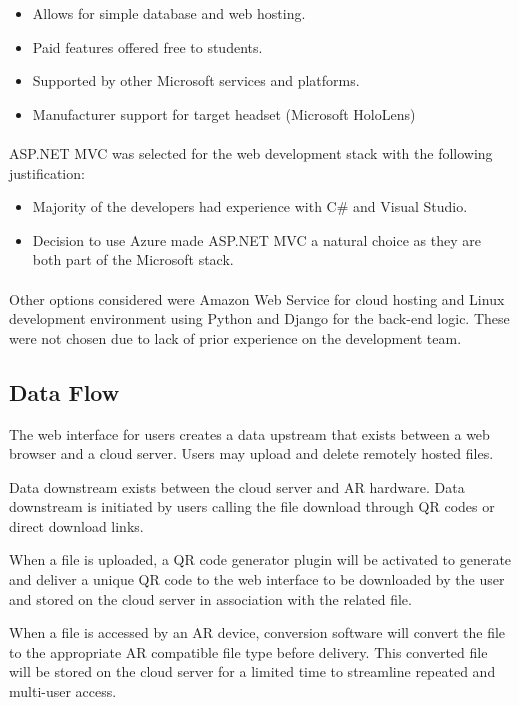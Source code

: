  \begin{itemize}
    \item Allows for simple database and web hosting.
    \item Paid features offered free to students.
    \item Supported by other Microsoft services and platforms. 
    \item Manufacturer support for target headset (Microsoft HoloLens)
 \end{itemize}
 
 \paragraph{}
 ASP.NET MVC was selected for the web development stack with the following justification:

\begin{itemize}
    \item Majority of the developers had experience with C\# and Visual Studio.
    \item Decision to use Azure made ASP.NET MVC a natural choice as they are both part of the Microsoft stack.
\end{itemize}

\paragraph{}
Other options considered were Amazon Web Service for cloud hosting and Linux development environment using Python and Django for the back-end logic. These were not chosen due to lack of prior experience on the development team. 

 \subsection{Data Flow}
The web interface for users creates a data upstream that exists between a web browser and a cloud server. Users may upload and delete remotely hosted files.

Data downstream exists between the cloud server and AR hardware. Data downstream is initiated by users calling the file download through QR codes or direct download links. 

When a file is uploaded, a QR code generator plugin will be activated to generate and deliver a unique QR code to the web interface to be downloaded by the user and stored on the cloud server in association with the related file. 

When a file is accessed by an AR device, conversion software will convert the file to the appropriate AR compatible file type before delivery. This converted file will be stored on the cloud server for a limited time to streamline repeated and multi-user access.
  
